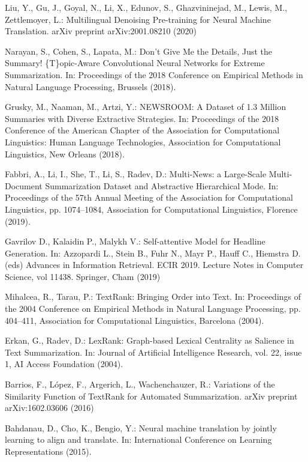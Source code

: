 \documentclass[runningheads]{llncs}
\begin{document}
\begin{thebibliography}{8}
Liu, Y., Gu, J., Goyal, N., Li, X., Edunov, S., Ghazvininejad, M., Lewis, M., Zettlemoyer, L.: Multilingual Denoising Pre-training for Neural Machine Translation. arXiv preprint arXiv:2001.08210 (2020)

Narayan, S., Cohen, S., Lapata, M.: Don't Give Me the Details, Just the Summary! \{T\}opic-Aware Convolutional Neural Networks for Extreme Summarization. In: Proceedings of the 2018 Conference on Empirical Methods in Natural Language Processing, Brussels (2018).

Grusky, M., Naaman, M., Artzi, Y.: NEWSROOM: A Dataset of 1.3 Million Summaries with Diverse Extractive Strategies. In: Proceedings of the 2018 Conference of the American Chapter of the Association for Computational Linguistics: Human Language Technologies, Association for Computational Linguistics, New Orleans (2018).

Fabbri, A., Li, I., She, T., Li, S., Radev, D.: Multi-News: a Large-Scale Multi-Document Summarization Dataset and Abstractive Hierarchical Mode. In: Proceedings of the 57th Annual Meeting of the Association for Computational Linguistics, pp. 1074–1084, Association for Computational Linguistics, Florence (2019).

Gavrilov D., Kalaidin P., Malykh V.: Self-attentive Model for Headline Generation. In: Azzopardi L., Stein B., Fuhr N., Mayr P., Hauff C., Hiemstra D. (eds) Advances in Information Retrieval. ECIR 2019. Lecture Notes in Computer Science, vol 11438. Springer, Cham (2019)

Mihalcea, R., Tarau, P.: TextRank: Bringing Order into Text. In: Proceedings of the 2004 Conference on Empirical Methods in Natural Language Processing, pp. 404–411, Association for Computational Linguistics, Barcelona (2004).

Erkan, G., Radev, D.: LexRank: Graph-based Lexical Centrality as Salience in Text Summarization. In: Journal of Artificial Intelligence Research, vol. 22, issue 1, AI Access Foundation (2004).

Barrios, F., L{\'{o}}pez, F., Argerich, L., Wachenchauzer, R.: Variations of the Similarity Function of TextRank for Automated Summarization. arXiv preprint arXiv:1602.03606 (2016)

Bahdanau, D., Cho, K., Bengio, Y.: Neural machine translation by jointly
learning to align and translate. In: International Conference on Learning Representations (2015).


\end{thebibliography}
\end{document}
